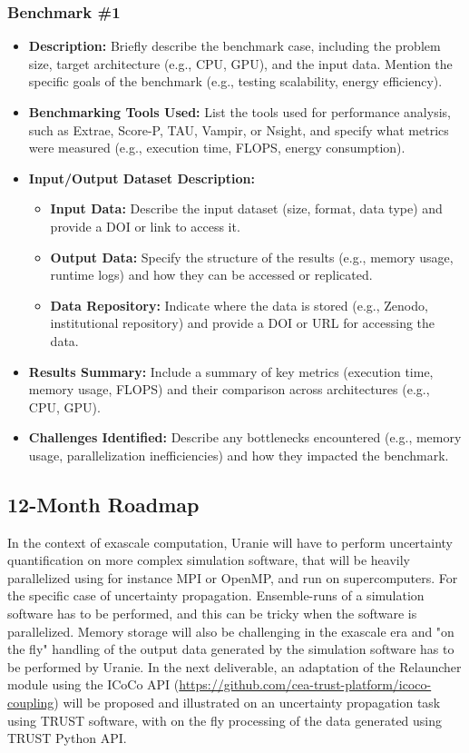 \subsubsection{Benchmark \#1}
\begin{itemize}
    \item \textbf{Description:} Briefly describe the benchmark case, including the problem size, target architecture (e.g., CPU, GPU), and the input data. Mention the specific goals of the benchmark (e.g., testing scalability, energy efficiency).
    \item \textbf{Benchmarking Tools Used:} List the tools used for performance analysis, such as Extrae, Score-P, TAU, Vampir, or Nsight, and specify what metrics were measured (e.g., execution time, FLOPS, energy consumption).
    \item \textbf{Input/Output Dataset Description:}
        \begin{itemize}
            \item \textbf{Input Data:} Describe the input dataset (size, format, data type) and provide a DOI or link to access it.
            \item \textbf{Output Data:} Specify the structure of the results (e.g., memory usage, runtime logs) and how they can be accessed or replicated.
            \item \textbf{Data Repository:} Indicate where the data is stored (e.g., Zenodo, institutional repository) and provide a DOI or URL for accessing the data.
        \end{itemize}
    \item \textbf{Results Summary:} Include a summary of key metrics (execution time, memory usage, FLOPS) and their comparison across architectures (e.g., CPU, GPU).
    \item \textbf{Challenges Identified:} Describe any bottlenecks encountered (e.g., memory usage, parallelization inefficiencies) and how they impacted the benchmark.
\end{itemize}

\subsection{12-Month Roadmap}
\label{sec:WP6:Uranie:roadmap}

In the context of exascale computation, Uranie will have to perform uncertainty quantification on more complex simulation software, that will be heavily parallelized using for instance MPI or OpenMP, and run on supercomputers. For the specific case of uncertainty propagation. Ensemble-runs of a simulation software has to be performed, and this can be tricky when the software is parallelized. Memory storage will also be challenging in the exascale era and "on the fly" handling of the output data generated by the simulation software has to be performed by Uranie. In the next deliverable, an adaptation of the Relauncher module using the ICoCo API (\url{https://github.com/cea-trust-platform/icoco-coupling}) will be proposed and illustrated on an uncertainty propagation task using TRUST software, with on the fly processing of the data generated using TRUST Python API.  


